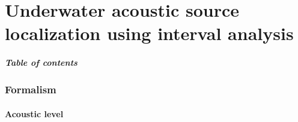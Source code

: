 \documentclass[9pt, xcolor={usenames, dvipsnames}]{beamer}
\begin{document}
	\part{Underwater acoustic source localization using interval analysis}

		\begin{frame}
			\frametitle{Table of contents}
			\tableofcontents%
		\end{frame}

		\section{Formalism}

			\subsection{Acoustic level}
\end{document}

